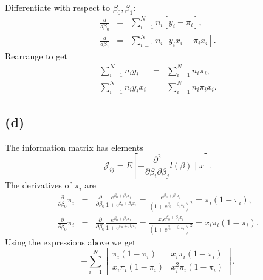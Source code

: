 Differentiate with respect to $\beta_{0},\beta_{1}$:
\begin{eqnarray*}
\frac{d}{d\beta_{0}} & = & \sum_{i=1}^{N}n_{i}\left[y_{i}-\pi_{i}\right],\\
\frac{d}{d\beta_{1}} & = & \sum_{i=1}^{N}n_{i}\left[y_{i}x_{i}-\pi_{i}x_{i}\right].
\end{eqnarray*}
Rearrange to get
\begin{eqnarray*}
\sum_{i=1}^{N}n_{i}y_{i} & = & \sum_{i=1}^{N}n_{i}\pi_{i},\\
\sum_{i=1}^{N}n_{i}y_{i}x_{i} & = & \sum_{i=1}^{N}n_{i}\pi_{i}x_{i}.
\end{eqnarray*}


\subsection*{(d)}

The information matrix has elements
\[
\mathcal{J}_{ij}=E\left[-\frac{\partial^{2}}{\partial\beta_{i}\partial\beta_{j}}l(\beta)\mid x\right].
\]
The derivatives of $\pi_{i}$ are
\begin{eqnarray*}
\frac{\partial}{\partial\beta_{0}}\pi_{i} & = & \frac{\partial}{\partial\beta_{0}}\frac{e^{\beta_{0}+\beta_{1}x_{i}}}{1+e^{\beta_{0}+\beta_{1}x_{i}}}=\frac{e^{\beta_{0}+\beta_{1}x_{i}}}{\left(1+e^{\beta_{0}+\beta_{1}x_{i}}\right)^{2}}=\pi_{i}(1-\pi_{i}),\\
\frac{\partial}{\partial\beta_{0}}\pi_{i} & = & \frac{\partial}{\partial\beta_{0}}\frac{e^{\beta_{0}+\beta_{1}x_{i}}}{1+e^{\beta_{0}+\beta_{1}x_{i}}}=\frac{x_{i}e^{\beta_{0}+\beta_{1}x_{i}}}{\left(1+e^{\beta_{0}+\beta_{1}x_{i}}\right)^{2}}=x_{i}\pi_{i}(1-\pi_{i}).
\end{eqnarray*}
Using the expressions above we get
\[
-\sum_{i=1}^{N}\left[\begin{array}{cc}
\pi_{i}(1-\pi_{i}) & x_{i}\pi_{i}(1-\pi_{i})\\
x_{i}\pi_{i}(1-\pi_{i}) & x_{i}^{2}\pi_{i}(1-\pi_{i})
\end{array}\right].
\]